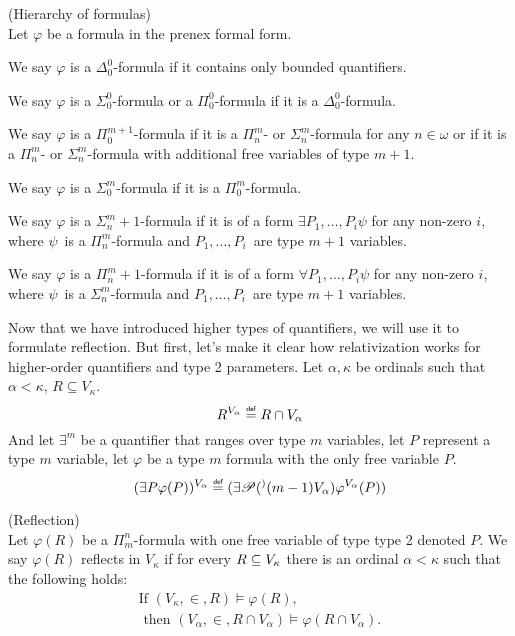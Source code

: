 \begin{definition}{(Hierarchy of formulas)}\label{def:analytical_hierarchy}\\
Let $\varphi$ be a formula in the prenex formal form.
\bce[(i)]
\item We say $\varphi$ is a $\Delta^0_0$-formula if it contains only bounded quantifiers.
\item We say $\varphi$ is a $\Sigma^0_0$-formula or a $\Pi^0_0$-formula if it is a $\Delta^0_0$-formula.
\item We say $\varphi$ is a $\Pi^{m+1}_0$-formula if it is a $\Pi^m_n$- or $\Sigma^m_n$-formula for any $n \in \omega$ or if it is a $\Pi^m_n$- or $\Sigma^m_n$-formula with additional free variables of type $m+1$.
\item We say $\varphi$ is a $\Sigma^m_0$-formula if it is a $\Pi^m_0$-formula.
\item We say $\varphi$ is a $\Sigma^m_n+1$-formula if it is of a form $\exists P_1, \ldots, P_i \psi$ for any non-zero $i$, where $\psi$ is a $\Pi^m_n$-formula and $P_1, \ldots, P_i$ are type $m+1$ variables.
\item We say $\varphi$ is a $\Pi^m_n+1$-formula if it is of a form $\forall P_1, \ldots, P_i \psi$ for any non-zero $i$, where $\psi$ is a $\Sigma^m_n$-formula and $P_1, \ldots, P_i$ are type $m+1$ variables.
\ece
\end{definition}

Now that we have introduced higher types of quantifiers, we will use it to formulate reflection. But first, let's make it clear how relativization works for higher-order quantifiers and type 2 parameters. Let $\alpha, \kappa$ be ordinals such that $\alpha < \kappa$, $R \subseteq V_\kappa$.
\begin{equation}
R^{V_\alpha} \defeq R \cap V_\alpha
\end{equation}
And let $\exists^{m}$ be a quantifier that ranges over type $m$ variables, let $P$ represent a type $m$ variable, let $\varphi$ be a type $m$ formula with the only free variable $P$.
\begin{equation}
(\exists P \varphi(P))^{V_\alpha} \defeq (\exists \power^(m-1){V_\alpha})\varphi^{V_\alpha}(P))
\end{equation}


\begin{definition}{(Reflection)}\label{def:reflection_2}\\
Let $\varphi(R)$ be a $\Pi^n_m$-formula with one free variable of type type 2 denoted $P$. We say $\varphi(R)$ reflects in $V_\kappa$ if for every $R \subseteq V_\kappa$ there is an ordinal $\alpha<\kappa$ such that the following holds:
\begin{equation}
\begin{gathered}
\mbox{If }(V_\kappa,\in, R)\models \varphi(R),\\
\mbox{ then }(V_\alpha,\in, R\cap V_\alpha) \models \varphi(R\cap V_\alpha).
\end{gathered}
\end{equation}
\end{definition}

